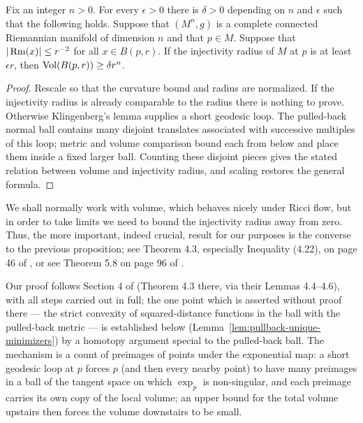 \begin{proposition}
\label{prop:injectivity-radius-volume}

\label{injvol}

Fix an integer $n>0$. For every $\epsilon>0$ there is $\delta>0$
depending on $n$ and $\epsilon$ such that the following holds.
Suppose that $(M^n,g)$ is a complete connected Riemannian
manifold of dimension $n$ and that $p\in M$. Suppose that $|\operatorname{Rm}(x)|\le
r^{-2}$ for all $x\in B(p,r)$. If the injectivity radius of $M$ at
$p$ is at least $\epsilon r$, then $\operatorname{Vol}(B(p,r))\ge \delta
r^n$.
\end{proposition}

\begin{proof}
\sketch
{}
Rescale so that the curvature bound and radius are normalized. If the injectivity radius is already comparable to the radius there is nothing to prove. Otherwise Klingenberg's lemma supplies a short geodesic loop. The pulled-back normal ball contains many disjoint translates associated with successive multiples of this loop; metric and volume comparison bound each from below and place them inside a fixed larger ball. Counting these disjoint pieces gives the stated relation between volume and injectivity radius, and scaling restores the general formula.
\end{proof}

 We shall normally work with volume, which behaves nicely under Ricci
flow, but in order to take limits we need to bound the injectivity
radius away from zero. Thus, the more important, indeed crucial,
result for our purposes is the converse to the previous proposition;
see Theorem 4.3, especially Inequality (4.22), on page 46 of
\cite{CheegerGromovTaylor}, or see Theorem 5.8 on page 96 of
\cite{CheegerEbin}.

Our proof follows Section 4 of \cite{CheegerGromovTaylor}
(Theorem 4.3 there, via their Lemmas 4.4--4.6), with all steps
carried out in full; the one point which is asserted without proof
there --- the strict convexity of squared-distance functions in the
ball with the pulled-back metric --- is established below
(Lemma~\ref{lem:pullback-unique-minimizers}) by a homotopy argument
special to the pulled-back ball. The mechanism is a count of
preimages of points under the exponential map: a short geodesic
loop at $p$ forces $p$ (and then every nearby point) to have many
preimages in a ball of the tangent space on which
$\exp_p$ is non-singular, and each preimage carries its own copy
of the local volume; an upper bound for the total volume upstairs
then forces the volume downstairs to be small.

